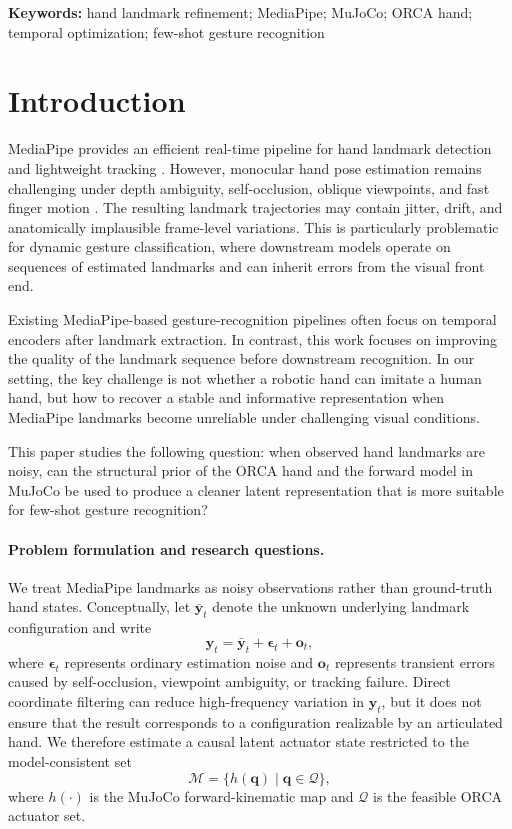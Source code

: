 \documentclass[11pt]{article}
\begin{document}
\noindent\textbf{Keywords:} hand landmark refinement; MediaPipe; MuJoCo; ORCA hand; temporal optimization; few-shot gesture recognition

\section{Introduction}
MediaPipe provides an efficient real-time pipeline for hand landmark detection and lightweight tracking \cite{zhang2020mediapipehands}. However, monocular hand pose estimation remains challenging under depth ambiguity, self-occlusion, oblique viewpoints, and fast finger motion \cite{zimmermann2017learning,boukhayma2019handwild}. The resulting landmark trajectories may contain jitter, drift, and anatomically implausible frame-level variations. This is particularly problematic for dynamic gesture classification, where downstream models operate on sequences of estimated landmarks and can inherit errors from the visual front end.

Existing MediaPipe-based gesture-recognition pipelines often focus on temporal encoders after landmark extraction. In contrast, this work focuses on improving the quality of the landmark sequence before downstream recognition. In our setting, the key challenge is not whether a robotic hand can imitate a human hand, but how to recover a stable and informative representation when MediaPipe landmarks become unreliable under challenging visual conditions.

This paper studies the following question: when observed hand landmarks are noisy, can the structural prior of the ORCA hand and the forward model in MuJoCo \cite{todorov2012mujoco} be used to produce a cleaner latent representation that is more suitable for few-shot gesture recognition?

\paragraph{Problem formulation and research questions.}
We treat MediaPipe landmarks as noisy observations rather than ground-truth hand states. Conceptually, let $\bar{\mathbf y}_t$ denote the unknown underlying landmark configuration and write
\[
\mathbf y_t = \bar{\mathbf y}_t + \boldsymbol{\epsilon}_t + \mathbf o_t,
\]
where $\boldsymbol{\epsilon}_t$ represents ordinary estimation noise and $\mathbf o_t$ represents transient errors caused by self-occlusion, viewpoint ambiguity, or tracking failure. Direct coordinate filtering can reduce high-frequency variation in $\mathbf y_t$, but it does not ensure that the result corresponds to a configuration realizable by an articulated hand. We therefore estimate a causal latent actuator state restricted to the model-consistent set
\[
\mathcal M = \{h(\mathbf q)\mid \mathbf q\in\mathcal Q\},
\]
where $h(\cdot)$ is the MuJoCo forward-kinematic map and $\mathcal Q$ is the feasible ORCA actuator set.
\end{document}
